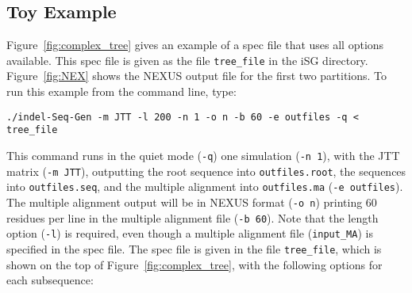 \documentclass[10pt]{article}
\begin{document}
\subsection{Toy Example}

Figure~\ref{fig:complex_tree} gives an example of a spec file that uses all options available.   
This spec file is given as the file {\tt tree\_file} in the iSG directory.
Figure~\ref{fig:NEX} shows the NEXUS output file for the first two partitions.
To run this example from the command line, type:

\begin{verbatim}
./indel-Seq-Gen -m JTT -l 200 -n 1 -o n -b 60 -e outfiles -q < tree_file
\end{verbatim}

This command runs in the quiet mode ({\tt -q}) one simulation ({\tt -n 1}), with the JTT
matrix ({\tt -m JTT}), outputting the root sequence into {\tt outfiles.root}, the sequences
into {\tt outfiles.seq}, and the multiple alignment into {\tt outfiles.ma} ({\tt -e
outfiles}). The multiple alignment output will be in NEXUS format ({\tt -o n}) printing 60
residues per line in the multiple alignment file ({\tt -b 60}).  Note that the length option
({\tt -l})  is required, even though a multiple alignment file ({\tt input\_MA}) is specified
in the spec file.  The spec file is given in the file {\tt tree\_file}, which is shown on the
top of Figure~\ref{fig:complex_tree}, with the following options for each subsequence:
\end{document}
